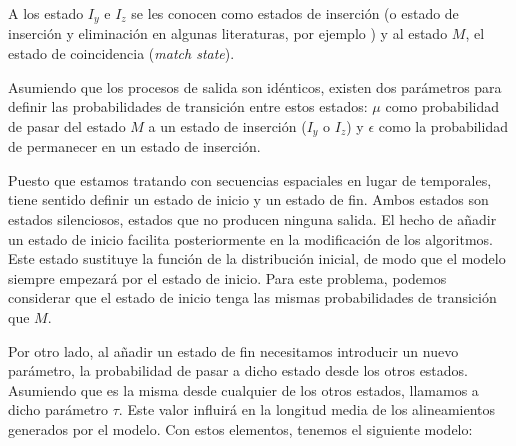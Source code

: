 A los estado $I_y$ e $I_z$ se les conocen como estados de inserción (o estado de inserción y eliminación en algunas literaturas, por ejemplo \cite{Marina}) y al estado $M$, el estado de coincidencia (\textit{match state}). 


Asumiendo que los procesos de salida son idénticos, existen dos parámetros para definir las probabilidades de transición entre estos estados: $\mu$ como probabilidad de pasar del estado $M$ a un estado de inserción ($I_y$ o $I_z$) y $\epsilon$ como la probabilidad de permanecer en un estado de inserción.

Puesto que estamos tratando con secuencias espaciales en lugar de temporales, tiene sentido definir un estado de inicio y un estado de fin. Ambos estados son estados silenciosos, estados que no producen ninguna salida. El hecho de añadir un estado de inicio facilita posteriormente en la modificación de los algoritmos. Este estado sustituye la función de la distribución inicial, de modo que el modelo siempre empezará por el estado de inicio. Para este problema, podemos considerar que el estado de inicio tenga las mismas probabilidades de transición que $M$.

Por otro lado, al añadir un estado de fin necesitamos introducir un nuevo parámetro, la probabilidad de pasar a dicho estado desde los otros estados. Asumiendo que es la misma desde cualquier de los otros estados, llamamos a dicho parámetro $\tau$. Este valor influirá en la longitud media de los alineamientos generados por el modelo. Con estos elementos, tenemos el siguiente modelo:

